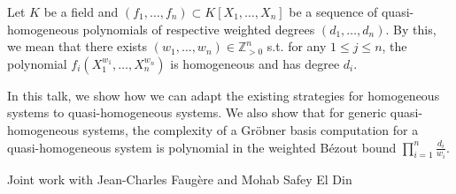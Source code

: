 \documentclass[10pt,a4paper]{scrartcl}
\begin{document}

Let $K$ be a field and $(f_1, \ldots, f_n)\subset K[X_1, \ldots, X_n]$ be a sequence of quasi-homogeneous polynomials of respective weighted degrees $(d_1, \ldots, d_n)$.  By this, we mean that there exists $(w_{1},\dots,w_{n}) \in \mathbb{Z}_{>0}^{n}$ s.t. for any $1 \leq j \leq n$, the polynomial $f_{i}(X_{1}^{w_{1}},\dots,X_{n}^{w_{n}})$ is homogeneous and has degree $d_{i}$.

In this talk, we show how we can adapt the existing strategies for homogeneous systems to quasi-homogeneous systems. We also show that for generic quasi-homogeneous systems, the complexity of a Gröbner basis computation for a quasi-homogeneous system is polynomial in the weighted Bézout bound $\prod_{i=1}^n\frac{d_i}{w_i}$.

Joint work with Jean-Charles Faugère and Mohab Safey El Din



\end{document}
